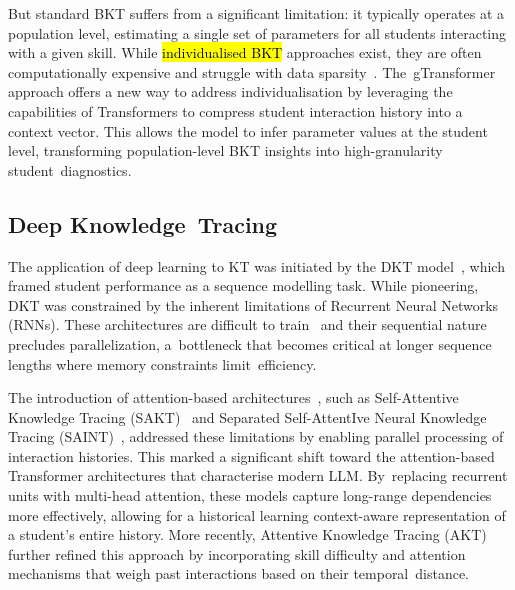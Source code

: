 \documentclass[applsci,article,accept,moreauthors,pdftex]{Definitions/mdpi}
\begin{document}
But standard BKT suffers from a significant limitation: it typically operates at a population level, estimating a single set of parameters for all students interacting with a given skill. While \hl{individualised BKT} approaches exist, they are often computationally expensive and struggle with data sparsity~\citep{yudelson2013individualized}. %
The~gTransformer approach offers a new way to address {individualisation} by leveraging the capabilities of Transformers to compress student interaction history into a context vector. This allows the model to infer parameter values at the student level, transforming population-level BKT insights into high-granularity student~diagnostics.


\subsection{Deep Knowledge~Tracing}

The application of deep learning to KT was initiated by the DKT model~\citep{piech2015deep}, which framed student performance as a sequence {modelling} task. While pioneering, DKT was constrained by the inherent limitations of Recurrent Neural Networks (RNNs). These architectures are difficult to train~\citep{Pascanu20132347} and their sequential nature precludes parallelization, a~bottleneck that becomes critical at longer sequence lengths where memory constraints limit~efficiency. 

The introduction of attention-based architectures~\citep{vaswani2017attention}, such as Self-Attentive Knowledge Tracing (SAKT)~\citep{Pandey2019384} and Separated Self-AttentIve Neural Knowledge Tracing (SAINT)~\citep{choi2020towards}, addressed these limitations by enabling parallel processing of interaction histories. This marked a significant shift toward the attention-based Transformer architectures that characterise modern LLM. By~replacing recurrent units with multi-head attention, these models capture long-range dependencies more effectively, allowing for a historical learning context-aware representation of a student's entire history. More recently, Attentive Knowledge Tracing (AKT)~\citep{ghosh2020context} further refined this approach by incorporating skill difficulty and attention mechanisms that weigh past interactions based on their temporal~distance. 
\end{document}
